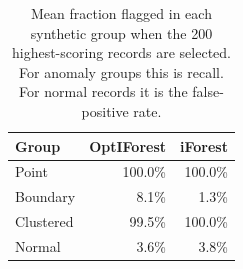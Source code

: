 \begin{table}[t]\centering\small
\begin{tabular}{lrr}\toprule
Group & OptIForest & iForest \\ \midrule
Point & 100.0\% & 100.0\% \\
Boundary & 8.1\% & 1.3\% \\
Clustered & 99.5\% & 100.0\% \\
Normal & 3.6\% & 3.8\% \\
\bottomrule\end{tabular}
\caption{Mean fraction flagged in each synthetic group when the 200 highest-scoring records are selected. For anomaly groups this is recall. For normal records it is the false-positive rate.}\label{tab:subtypes}
\end{table}
